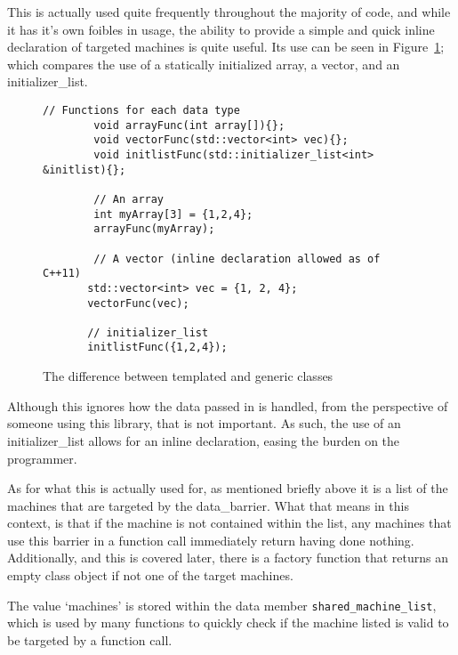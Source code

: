 \documentclass[report.tex]{subfiles}
\begin{document}
    This is actually used quite frequently throughout the majority of code, and while it has it's own foibles in usage, the ability to provide a simple and quick inline declaration of targeted machines is quite useful. Its use can be seen in Figure~\ref{fig:init_list_vs_others}; which compares the use of a statically initialized array, a vector, and an initializer\_list.

     \begin{figure}[htbp]
      \centering

      \lstset{language=cpp}  
      \begin{lstlisting}[tabsize=2]
        // Functions for each data type
        void arrayFunc(int array[]){};
        void vectorFunc(std::vector<int> vec){};
        void initlistFunc(std::initializer_list<int> &initlist){};

        // An array
        int myArray[3] = {1,2,4};
        arrayFunc(myArray);

        // A vector (inline declaration allowed as of C++11)
       std::vector<int> vec = {1, 2, 4};
       vectorFunc(vec);

       // initializer_list
       initlistFunc({1,2,4});
        \end{lstlisting}

      \caption{The difference between templated and generic classes}
      \label{fig:init_list_vs_others}
    \end{figure}

    Although this ignores how the data passed in is handled, from the perspective of someone using this library, that is not important. As such, the use of an initializer\_list allows for an inline declaration, easing the burden on the programmer.

    As for what this is actually used for, as mentioned briefly above it is a list of the machines that are targeted by the data\_barrier. What that means in this context, is that if the machine is not contained within the list, any machines that use this barrier in a function call immediately return having done nothing. Additionally, and this is covered later, there is a factory function that returns an empty class object if not one of the target machines.

    The value `machines' is stored within the data member \texttt{shared\_machine\_list}, which is used by many functions to quickly check if the machine listed is valid to be targeted by a function call.
\end{document}
